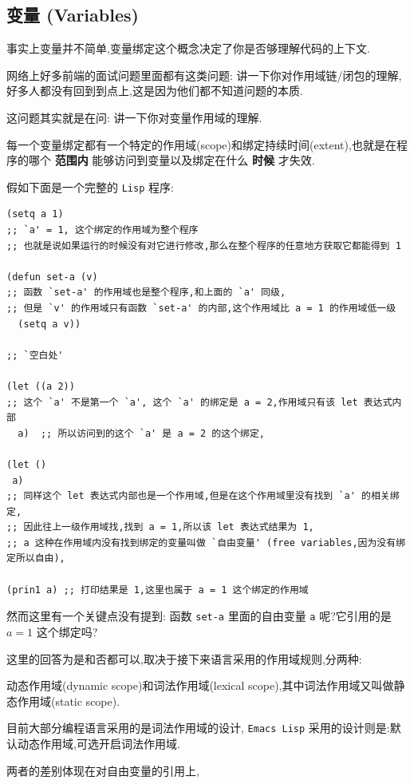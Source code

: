 \documentclass[11pt]{article}
\begin{document}
\subsection{变量 (Variables)}
\label{sec:org5848082}

事实上变量并不简单,变量绑定这个概念决定了你是否够理解代码的上下文.

网络上好多前端的面试问题里面都有这类问题: 讲一下你对作用域链/闭包的理解,好多人都没有回到到点上,这是因为他们都不知道问题的本质.

这问题其实就是在问: 讲一下你对变量作用域的理解.

每一个变量绑定都有一个特定的作用域(scope)和绑定持续时间(extent),也就是在程序的哪个 \textbf{范围内} 能够访问到变量以及绑定在什么 \textbf{时候} 才失效.

假如下面是一个完整的 \texttt{Lisp} 程序:

\begin{verbatim}
(setq a 1)
;; `a' = 1, 这个绑定的作用域为整个程序
;; 也就是说如果运行的时候没有对它进行修改,那么在整个程序的任意地方获取它都能得到 1

(defun set-a (v)
;; 函数 `set-a' 的作用域也是整个程序,和上面的 `a' 同级,
;; 但是 `v' 的作用域只有函数 `set-a' 的内部,这个作用域比 a = 1 的作用域低一级
  (setq a v))

;; `空白处'

(let ((a 2))
;; 这个 `a' 不是第一个 `a', 这个 `a' 的绑定是 a = 2,作用域只有该 let 表达式内部
  a)  ;; 所以访问到的这个 `a' 是 a = 2 的这个绑定,

(let ()
 a)
;; 同样这个 let 表达式内部也是一个作用域,但是在这个作用域里没有找到 `a' 的相关绑定,
;; 因此往上一级作用域找,找到 a = 1,所以该 let 表达式结果为 1,
;; a 这种在作用域内没有找到绑定的变量叫做 `自由变量' (free variables,因为没有绑定所以自由),

(prin1 a) ;; 打印结果是 1,这里也属于 a = 1 这个绑定的作用域
\end{verbatim}

然而这里有一个关键点没有提到: 函数 \texttt{set-a} 里面的自由变量 \texttt{a} 呢?它引用的是 \(a = 1\) 这个绑定吗?

这里的回答为是和否都可以,取决于接下来语言采用的作用域规则,分两种:

动态作用域(dynamic scope)和词法作用域(lexical scope),其中词法作用域又叫做静态作用域(static scope).

目前大部分编程语言采用的是词法作用域的设计, \texttt{Emacs Lisp} 采用的设计则是:默认动态作用域,可选开启词法作用域.

两者的差别体现在对自由变量的引用上,
\end{document}
